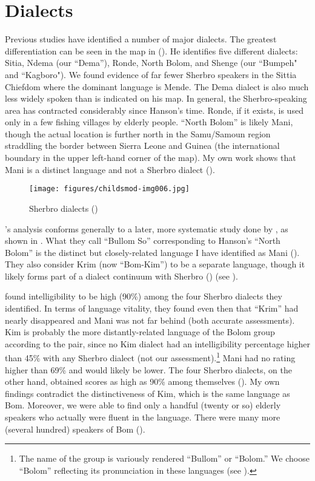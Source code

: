 \section{Dialects}
\label{sec:1.8}\hypertarget{Toc115517750}{}
Previous studies have identified a number of major dialects. The greatest differentiation can be seen in the map in \citet{Hanson1979a} (). He identifies five different dialects: Sitia, Ndema (our “Dema”), Ronde, North Bolom, and Shenge (our “Bumpeh" and “Kagboro"). We found evidence of far fewer Sherbro speakers in the Sittia Chiefdom where the dominant language is Mende. The Dema dialect is also much less widely spoken than is indicated on his map. In general, the Sherbro-speaking area has contracted considerably since Hanson's time. Ronde, if it exists, is used only in a few fishing villages by elderly people. “North Bolom” is likely Mani, though the actual location is further north in the Samu/Samoun region straddling the border between Sierra Leone and Guinea (the international boundary in the upper left-hand corner of the map). My own work shows that Mani is a distinct language and not a Sherbro dialect (\citealt{Childs2011}).

\begin{figure}
\caption{Sherbro dialects (\citealt{Hanson1979a})}
\label{fig:intro:6}
\texttt{[image: figures/childsmod-img006.jpg]}
\end{figure}

\citet{Hanson1979a}'s analysis conforms generally to a later, more systematic study done by \citet{IversonCameron1986}, as shown in . What they call “Bullom So” corresponding to Hanson's “North Bolom” is the distinct but closely-related language I have identified as Mani (\citealt{Childs2011}). They also consider Krim (now “Bom-Kim”) to be a separate language, though it likely forms part of a dialect continuum with Sherbro (\citealt{Childs2024a}) (see ).

\citet{IversonCameron1986} found intelligibility to be high (90\%) among the four Sherbro dialects they identified. In terms of language vitality, they found even then that “Krim” had nearly disappeared and Mani was not far behind (both accurate assessments). Kim is probably the more distantly-related language of the Bolom group according to the pair, since no Kim dialect had an intelligibility percentage higher than 45\% with any Sherbro dialect (not our assessment).\footnote{The name of the group is variously rendered “Bullom” or “Bolom.” We choose “Bolom” reflecting its pronunciation in these languages (see ).} Mani had no rating higher than 69\% and would likely be lower. The four Sherbro dialects, on the other hand, obtained scores as high as 90\% among themselves (\citealt{IversonCameron1986}). My own findings contradict the distinctiveness of Kim, which is the same language as Bom. Moreover, we were able to find only a handful (twenty or so) elderly speakers who actually were fluent in the language. There were many more (several hundred) speakers of Bom (\citealt{Childs2020}).

